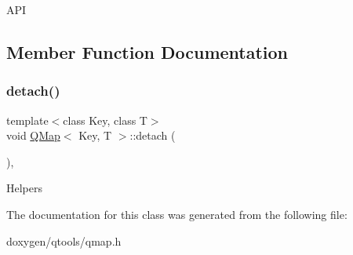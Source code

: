 A\+PI 

\subsection{Member Function Documentation}
\mbox{\label{class_q_map_a6913ba3a784e35a4b0d274f229af92ea}} 
\subsubsection{\texorpdfstring{detach()}{detach()}}
{\footnotesize\ttfamily template$<$class Key, class T$>$ \\
void \mbox{\hyperlink{class_q_map}{Q\+Map}}$<$ Key, T $>$\+::detach (\begin{DoxyParamCaption}{ }\end{DoxyParamCaption})\hspace{0.3cm}{\ttfamily [inline]}, {\ttfamily [protected]}}

Helpers 

The documentation for this class was generated from the following file\+:\begin{DoxyCompactItemize}
\item 
doxygen/qtools/qmap.\+h\end{DoxyCompactItemize}
